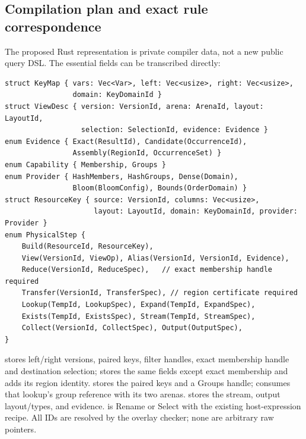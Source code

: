 \subsection{Compilation plan and exact rule correspondence}
\label{sec:ya-compilation}
The proposed Rust representation is private compiler data, not a new public
query DSL. The essential fields can be transcribed directly:
\begin{lstlisting}
struct KeyMap { vars: Vec<Var>, left: Vec<usize>, right: Vec<usize>,
                domain: KeyDomainId }
struct ViewDesc { version: VersionId, arena: ArenaId, layout: LayoutId,
                  selection: SelectionId, evidence: Evidence }
enum Evidence { Exact(ResultId), Candidate(OccurrenceId),
                Assembly(RegionId, OccurrenceSet) }
enum Capability { Membership, Groups }
enum Provider { HashMembers, HashGroups, Dense(Domain),
                Bloom(BloomConfig), Bounds(OrderDomain) }
struct ResourceKey { source: VersionId, columns: Vec<usize>,
                     layout: LayoutId, domain: KeyDomainId, provider: Provider }
enum PhysicalStep {
    Build(ResourceId, ResourceKey),
    View(VersionId, ViewOp), Alias(VersionId, VersionId, Evidence),
    Reduce(VersionId, ReduceSpec),   // exact membership handle required
    Transfer(VersionId, TransferSpec), // region certificate required
    Lookup(TempId, LookupSpec), Expand(TempId, ExpandSpec),
    Exists(TempId, ExistsSpec), Stream(TempId, StreamSpec),
    Collect(VersionId, CollectSpec), Output(OutputSpec),
}
\end{lstlisting}
 stores left/right versions, paired keys, filter handles,
exact membership handle and destination selection; 
stores the same fields except exact membership and adds its region identity.
 stores the paired keys and a Groups handle;
 consumes that lookup's group reference with its two arenas.
 stores the stream, output layout/types, and evidence.
 is Rename or Select with the existing host-expression recipe.
All IDs are resolved by the overlay checker; none are arbitrary raw pointers.

